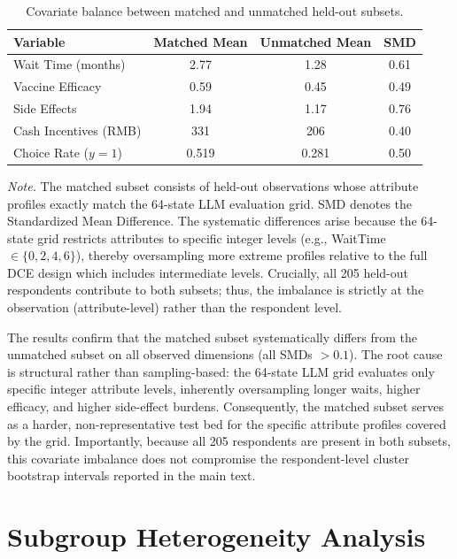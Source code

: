 \documentclass[11pt]{article}
\begin{document}
\begin{table}[h]
\centering
\caption{Covariate balance between matched and unmatched held-out subsets.}
\label{tab:balance_check}
\small
\begin{tabular}{l c c c}
\toprule
\textbf{Variable} & \textbf{Matched Mean} & \textbf{Unmatched Mean} & \textbf{SMD} \\
\midrule
Wait Time (months) & 2.77 & 1.28 & 0.61 \\
Vaccine Efficacy & 0.59 & 0.45 & 0.49 \\
Side Effects & 1.94 & 1.17 & 0.76 \\
Cash Incentives (RMB) & 331 & 206 & 0.40 \\
Choice Rate ($y=1$) & 0.519 & 0.281 & 0.50 \\
\bottomrule
\end{tabular}
\vspace{0.4em}
\begin{minipage}{0.95\textwidth}
\small
\textit{Note.} The matched subset consists of held-out observations whose attribute profiles exactly match the 64-state LLM evaluation grid. SMD denotes the Standardized Mean Difference. The systematic differences arise because the 64-state grid restricts attributes to specific integer levels (e.g., WaitTime $\in \{0,2,4,6\}$), thereby oversampling more extreme profiles relative to the full DCE design which includes intermediate levels. Crucially, all 205 held-out respondents contribute to both subsets; thus, the imbalance is strictly at the observation (attribute-level) rather than the respondent level.
\end{minipage}
\end{table}

The results confirm that the matched subset systematically differs from the unmatched subset on all observed dimensions (all SMDs $> 0.1$). The root cause is structural rather than sampling-based: the 64-state LLM grid evaluates only specific integer attribute levels, inherently oversampling longer waits, higher efficacy, and higher side-effect burdens. Consequently, the matched subset serves as a harder, non-representative test bed for the specific attribute profiles covered by the grid. Importantly, because all 205 respondents are present in both subsets, this covariate imbalance does not compromise the respondent-level cluster bootstrap intervals reported in the main text.

\section{Subgroup Heterogeneity Analysis}
\label{app:heterogeneity}
\end{document}
